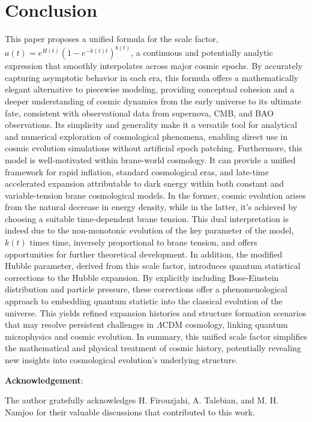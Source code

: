 \documentclass[12pt]{article}  %
\begin{document}
\section{Conclusion}	
This paper proposes a unified formula for the scale factor, $a(t)=e^{H(t)} (1-e^{-k(t)t})^{b(t)}$, a continuous and potentially analytic expression that smoothly interpolates across major cosmic epochs. By accurately capturing asymptotic behavior in each era, this formula offers a mathematically elegant alternative to piecewise modeling, providing conceptual cohesion and a deeper understanding of cosmic dynamics from the early universe to its ultimate fate, consistent with observational data from supernova, CMB, and BAO observations. Its simplicity and generality make it a versatile tool for analytical and numerical exploration of cosmological phenomena, enabling direct use in cosmic evolution simulations without artificial epoch patching.
Furthermore, this model is well-motivated within brane-world cosmology. It can provide a unified framework for rapid inflation, standard cosmological eras, and late-time accelerated expansion attributable to dark energy within both constant and variable-tension brane cosmological models. In the former, cosmic evolution arises from the natural decrease in energy density, while in the latter, it's achieved by choosing a suitable time-dependent brane tension. This dual interpretation is indeed due to the non-monotonic evolution of the key parameter of the model, $k(t)$ times time, inversely proportional to brane tension, and offers opportunities for further theoretical development. 
In addition, the modified Hubble parameter, derived from this scale factor, introduces quantum statistical corrections to the Hubble expansion. By explicitly including Bose-Einstein distribution and particle pressure, these corrections offer a phenomenological approach to embedding quantum statistic into the classical evolution of the universe. This yields refined expansion histories and structure formation scenarios that may resolve persistent challenges in $\Lambda$CDM cosmology, linking quantum microphysics and cosmic evolution.
In summary, this unified scale factor simplifies the mathematical and physical treatment of cosmic history, potentially revealing new insights into cosmological evolution's underlying structure.


{\bf Acknowledgement}:

The author gratefully acknowledges H. Firouzjahi, A. Talebian, and M. H. Namjoo for their valuable discussions that contributed to this work. 
\end{document}
